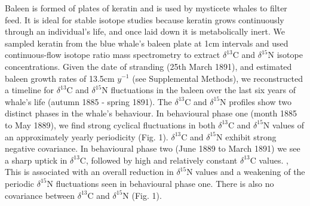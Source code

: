 \documentclass[a4paper,12pt]{article}
\begin{document}
Baleen is formed of plates of keratin and is used by mysticete whales to filter feed. 
It is ideal for stable isotope studies because keratin grows continuously through an individual's life, and once laid down it is metabolically inert\cite{best1996stable}. 
We sampled keratin from the blue whale's baleen plate at 1cm intervals and used continuous-flow isotope ratio mass spectrometry to extract $\delta^{13}$C and $\delta^{15}$N isotope concentrations. 
Given the date of stranding (25th March 1891), and estimated baleen growth rates of 13.5cm $y^{-1}$ (see Supplemental Methods), we reconstructed a timeline for $\delta^{13}$C and $\delta^{15}$N fluctuations in the baleen over the last six years of whale's life (autumn 1885 - spring 1891). The $\delta^{13}$C and $\delta^{15}$N profiles show two distinct phases in the whale's behaviour. 
In behavioural phase one (month 1885 to May 1889), we find strong cyclical fluctuations in both $\delta^{13}$C and $\delta^{15}$N values of an approximately yearly periodicity (Fig. 1). $\delta^{13}$C and $\delta^{15}$N exhibit strong negative covariance. 
In behavioural phase two (June 1889 to March 1891) we see a sharp uptick in $\delta^{13}$C, followed by high and relatively constant $\delta^{13}$C values. ,
This is associated with an overall reduction in $\delta^{15}$N values and a weakening of the periodic $\delta^{15}$N fluctuations seen in behavioural phase one. There is also no covariance between $\delta^{13}$C and $\delta^{15}$N (Fig. 1). 


\end{document}
